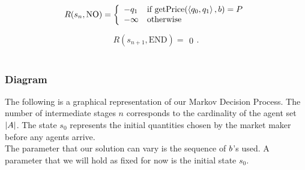 \[ R(s_{n}, \text{NO}) =  \left\{
\begin{array}{ll}
      -{q_1} & \text{if getPrice}(\left<{q_0}, {q_1}\right>, b) = P \\
      -\infty & \text{otherwise} \\
\end{array} 
\right. \]

\[ R(s_{n+1}, \text{END}) =
\begin{array}{ll}
      0
\end{array}. \]\\



\subsubsection{Diagram}
The following is a graphical representation of our Markov Decision Process. The number of intermediate stages $n$ corresponds to the cardinality of the agent set $|A|$. The state $s_0$ represents the initial quantities chosen by the market maker before any agents arrive. \\

The parameter that our solution can vary is the sequence of $b$'s used. A parameter that we will hold as fixed for now is the initial state $s_0$.\\

